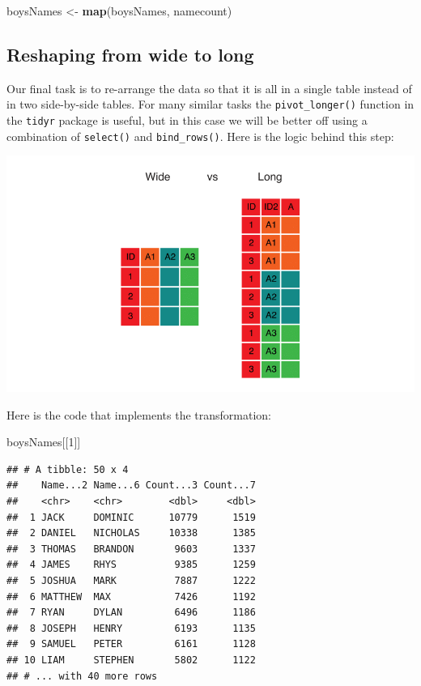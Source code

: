 \documentclass[
]{book}
\newenvironment{Shaded}{\begin{snugshade}}{\end{snugshade}}
\newcommand{\DecValTok}[1]{\textcolor[rgb]{0.00,0.00,0.81}{#1}}
\newcommand{\KeywordTok}[1]{\textcolor[rgb]{0.13,0.29,0.53}{\textbf{#1}}}
\newcommand{\NormalTok}[1]{#1}
\newcommand{\StringTok}[1]{\textcolor[rgb]{0.31,0.60,0.02}{#1}}
\begin{document}
\begin{alert}
\begin{Shaded}
\begin{Highlighting}[]
\NormalTok{  boysNames \textless{}{-}}\StringTok{ }\KeywordTok{map}\NormalTok{(boysNames, namecount)}
\end{Highlighting}
\end{Shaded}

\end{alert}

\hypertarget{reshaping-from-wide-to-long}{%
\subsection{Reshaping from wide to long}\label{reshaping-from-wide-to-long}}

Our final task is to re-arrange the data so that it is all in a single table instead of in two side-by-side tables. For many similar tasks the \texttt{pivot\_longer()} function in the \texttt{tidyr} package is useful, but in this case we will be better off using a combination of \texttt{select()} and \texttt{bind\_rows()}. Here is the logic behind this step:

\includegraphics{R/RDataWrangling/images/wide_vs_long.png}

Here is the code that implements the transformation:

\begin{Shaded}
\begin{Highlighting}[]
\NormalTok{boysNames[[}\DecValTok{1}\NormalTok{]]}
\end{Highlighting}
\end{Shaded}

\begin{verbatim}
## # A tibble: 50 x 4
##    Name...2 Name...6 Count...3 Count...7
##    <chr>    <chr>        <dbl>     <dbl>
##  1 JACK     DOMINIC      10779      1519
##  2 DANIEL   NICHOLAS     10338      1385
##  3 THOMAS   BRANDON       9603      1337
##  4 JAMES    RHYS          9385      1259
##  5 JOSHUA   MARK          7887      1222
##  6 MATTHEW  MAX           7426      1192
##  7 RYAN     DYLAN         6496      1186
##  8 JOSEPH   HENRY         6193      1135
##  9 SAMUEL   PETER         6161      1128
## 10 LIAM     STEPHEN       5802      1122
## # ... with 40 more rows
\end{verbatim}
\end{document}
